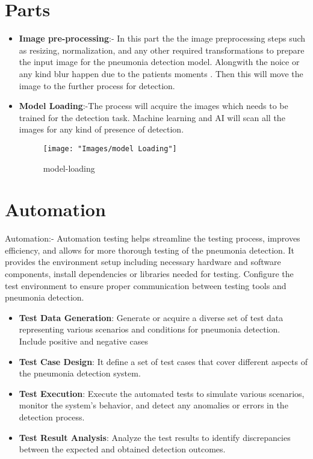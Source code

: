 \section{Parts}
\begin{itemize}
	\item\textbf{Image pre-processing}:- In this part the the image preprocessing steps such as resizing, normalization, and any other required transformations to prepare the input image for the pneumonia detection model. Alongwith the noice or any kind blur happen due to the patients moments . Then this will move the image to the further process for detection.
	
	\item\textbf{Model Loading}:-The process will acquire the images which needs to be trained for the detection task. Machine learning and AI will scan all the images for any kind of presence of detection.
	\begin{figure}
		\centering
		\texttt{[image: "Images/model Loading"]}
		\caption{model-loading}
		\label{fig:Model-loading}
	\end{figure}
	
	
	
\end{itemize}

\section{Automation}

Automation:-
Automation testing helps streamline the testing process, improves efficiency, and allows for more thorough testing of the pneumonia detection. It provides the environment setup including necessary hardware and software components, install dependencies or libraries needed for testing. Configure the test environment to ensure proper communication between testing tools and pneumonia detection.\\

\begin{itemize}
	\item\textbf{Test Data Generation}: Generate or acquire a diverse set of test data representing various scenarios and conditions for pneumonia detection. Include positive and negative cases
	\item\textbf{Test Case Design}: It define a set of test cases that cover different aspects of the pneumonia detection system.
	\item\textbf{Test Execution}: Execute the automated tests to simulate various scenarios, monitor the system's behavior, and detect any anomalies or errors in the detection process.
	\item\textbf{Test Result Analysis}: Analyze the test results to identify discrepancies between the expected and obtained detection outcomes.
\end{itemize}
\newpage


